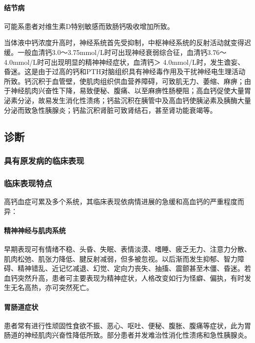 \paragraph{结节病}

可能系患者对维生素D特别敏感而致肠钙吸收增加所致。

当体液中钙浓度升高时，神经系统首先受抑制，中枢神经系统的反射活动就变得迟缓。一般血清钙3.0～3.75mmol/L时可出现神经衰弱综合征，血清钙3.76～4.0mmol/L时可出现明显的精神神经症状，血清钙＞
4.0mmol/L时，发生谵妄、昏迷。这是由于过高的钙和PTH对脑组织具有神经毒作用及干扰神经电生理活动所致。钙沉积于血管壁，使肌肉组织供血营养障碍，可致肌无力、萎缩、麻痹；由于神经肌肉兴奋性下降，易致便秘、腹痛、以至麻痹性肠梗阻；高血钙促使大量胃泌素分泌，故易发生消化性溃疡；钙盐沉积在胰管中及高血钙使胰泌素及胰酶大量分泌而致急性胰腺炎；钙盐沉积肾脏可致肾结石，甚至肾功能衰竭等。

\subsection{诊断}

\subsubsection{具有原发病的临床表现}

\subsubsection{临床表现特点}

高钙血症可累及多个系统，其临床表现依病情进展的急缓和高血钙的严重程度而异：

\paragraph{精神神经与肌肉系统}

早期表现可有情绪不稳、头昏、失眠、表情淡漠、嗜睡、疲乏无力、注意力分散、肌肉松弛、肌张力降低、腱反射减弱，但多被忽视。以后渐而发生抑郁、智力障碍、精神错乱、近记忆减退、幻觉、定向力丧失、抽搐、震颤甚至木僵、昏迷。若血钙突然升高，患者可主要表现为精神症状，人格改变如行为怪癖、偏执，有时发生无名高热，亦可突然死亡。

\paragraph{胃肠道症状}

患者常有进行性顽固性食欲不振、恶心、呕吐、便秘、腹胀、腹痛等症状，此为胃肠道的神经肌肉兴奋性降低所致。部分患者并发难治性消化性溃疡和急性胰腺炎。

